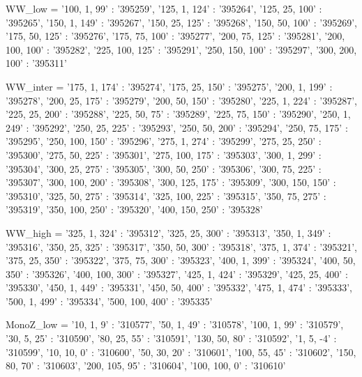 WW_low = {'100, 1, 99' : '395259',
        '125, 1, 124' : '395264',
        '125, 25, 100' : '395265',
        '150, 1, 149' : '395267',
        '150, 25, 125' : '395268',
        '150, 50, 100' : '395269',
        '175, 50, 125' : '395276',
        '175, 75, 100' : '395277',
        '200, 75, 125' : '395281',
        '200, 100, 100' : '395282',
        '225, 100, 125' : '395291',
        '250, 150, 100' : '395297',
        '300, 200, 100' : '395311'}




WW_inter = {'175, 1, 174' : '395274',
            '175, 25, 150' : '395275',
            '200, 1, 199' : '395278',
            '200, 25, 175' : '395279',
            '200, 50, 150' : '395280',
            '225, 1, 224' : '395287',
            '225, 25, 200' : '395288',
            '225, 50, 75' : '395289',
            '225, 75, 150' : '395290',
            '250, 1, 249' : '395292',
            '250, 25, 225' : '395293',
            '250, 50, 200' : '395294',
            '250, 75, 175' : '395295',
            '250, 100, 150' : '395296',
            '275, 1, 274' : '395299',
            '275, 25, 250' : '395300',
            '275, 50, 225' : '395301',
            '275, 100, 175' : '395303',
            '300, 1, 299' : '395304',
            '300, 25, 275' : '395305',
            '300, 50, 250' : '395306',
            '300, 75, 225' : '395307',
            '300, 100, 200' : '395308',
            '300, 125, 175' : '395309',
            '300, 150, 150' : '395310',
            '325, 50, 275' : '395314',
            '325, 100, 225' : '395315',
            '350, 75, 275' : '395319',
            '350, 100, 250' : '395320',
            '400, 150, 250' : '395328'}




WW_high = {'325, 1, 324' : '395312',
        '325, 25, 300' : '395313',
        '350, 1, 349' : '395316',
        '350, 25, 325' : '395317',
        '350, 50, 300' : '395318',
        '375, 1, 374' : '395321',
        '375, 25, 350' : '395322',
        '375, 75, 300' : '395323',
        '400, 1, 399' : '395324',
        '400, 50, 350' : '395326',
        '400, 100, 300' : '395327',
        '425, 1, 424' : '395329',
        '425, 25, 400' : '395330',
        '450, 1, 449' : '395331',
        '450, 50, 400' : '395332',
        '475, 1, 474' : '395333',
        '500, 1, 499' : '395334',
        '500, 100, 400' : '395335'}



MonoZ_low = {'10, 1, 9' : '310577',
            '50, 1, 49' : '310578',
            '100, 1, 99' : '310579',
            '30, 5, 25' : '310590',
            '80, 25, 55' : '310591',
            '130, 50, 80' : '310592',
            '1, 5, -4' : '310599',
            '10, 10, 0' : '310600',
            '50, 30, 20' : '310601',
            '100, 55, 45' : '310602',
            '150, 80, 70' : '310603',
            '200, 105, 95' : '310604',
            '100, 100, 0' : '310610'}



